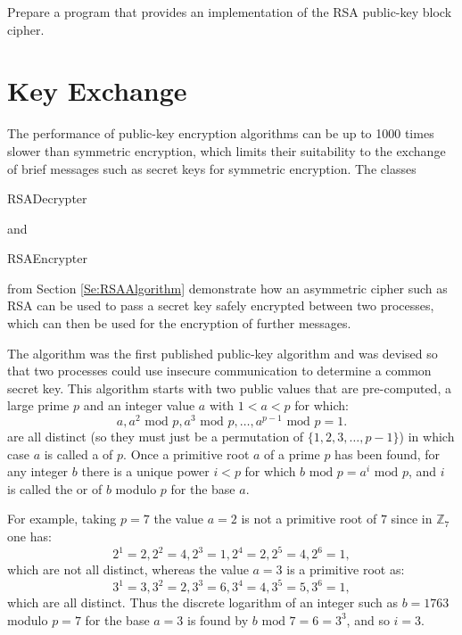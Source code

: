 \begin{exercise}
Prepare a program that provides an implementation of the RSA public-key block cipher.
\end{exercise}



\section{Key Exchange}


The performance of public-key encryption algorithms
can be up to 1000 times slower than symmetric encryption,
which limits their suitability to the exchange of
brief messages such as secret keys for symmetric encryption.
The classes \begin{code}RSADecrypter\end{code} and
\begin{code}RSAEncrypter\end{code} from Section \ref{Se:RSAAlgorithm}
demonstrate how an asymmetric cipher such as RSA can be used to pass a
secret key safely encrypted between two processes, which can then be
used for the encryption of further messages.

The  algorithm was the first published
public-key algorithm and was devised so that two processes could
use insecure communication to determine a common secret key.
This algorithm starts with two public values that are pre-computed,
a large prime $p$ and an integer value $a$ with $1<a<p$ for which:
\begin{displaymath}
  a, a^2\mbox{ mod }p, a^3\mbox{ mod }p, \dots, a^{p-1}\mbox{ mod }p=1.
\end{displaymath}
are all distinct (so they must just be a permutation of $\{1,2,3,\dots, p-1\}$)
in which case $a$ is called a  of $p$.
Once a primitive root $a$ of a prime $p$ has been found,
for any integer $b$ there is a unique power $i<p$
for which $b\mbox{ mod }p=a^i\mbox{ mod }p$, and $i$ is
called the  or  of $b$ modulo $p$ for
the base $a$.

For example, taking $p=7$ the value $a=2$ is not a primitive root of $7$ since in
$\mathbb{Z}_7$ one has:
\begin{displaymath}
  2^1=2, 2^2=4, 2^3=1, 2^4=2, 2^5=4, 2^6=1,
\end{displaymath}
which are not all distinct, whereas the value $a=3$ is a primitive root as:
\begin{displaymath}
  3^1=3, 3^2=2, 3^3=6, 3^4=4, 3^5=5, 3^6=1,
\end{displaymath}
which are all distinct.
Thus the discrete logarithm of an integer such as $b=1763$ modulo $p=7$ for the
base $a=3$ is found by $b\mbox{ mod }7=6=3^3$, and so $i=3$.


